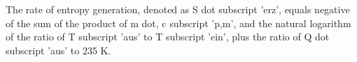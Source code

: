 The rate of entropy generation, denoted as S dot subscript 'erz', equals negative of the sum of the product of m dot, c subscript 'p,m', and the natural logarithm of the ratio of T subscript 'aus' to T subscript 'ein', plus the ratio of Q dot subscript 'aus' to 235 K.